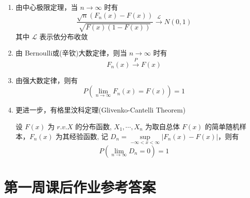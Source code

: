 \documentclass[openany]{book}
\begin{document}
\begin{enumerate}
  \item 由中心极限定理，当 $n \rightarrow \infty$ 时有
  \begin{equation}
   \frac{\sqrt{n}(F_n(x) - F(x))}{\sqrt{F(x)(1-F(x))}}
   \xrightarrow{\mathscr{L}} N(0,1)
  \end{equation}
  其中 $\mathscr{L}$ 表示依分布收敛
 \item 由 Bernoulli或(辛钦)大数定律，则当 $n \rightarrow \infty$ 时有
 \begin{equation}
  F_n(x) \xrightarrow{P} F(x)
 \end{equation}
  \item 由强大数定律，则有
  \begin{equation}
   P\left(\lim_{n\rightarrow \infty} F_n(x) =F(x)\right) = 1
  \end{equation}
 \item 更进一步，有格里汶科定理(Glivenko-Cantelli Theorem)
 \begin{definition}
   设 $F(x)$ 为 $r.v. X$ 的分布函数,  $X_1,\cdots,X_n$ 为取自总体 $F(x)$
   的简单随机样本，$F_n(x)$ 为其经验函数, 记 $D_n = \sup\limits_{-\infty
   <x <\infty} |F_n(x) - F(x)|$，则有
   \begin{equation}
    P\left( \lim\limits_{n\rightarrow \infty} D_n = 0\right) = 1
   \end{equation}
 \end{definition}


\end{enumerate}

\section{第一周课后作业参考答案}
\end{document}
